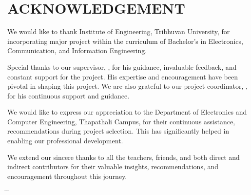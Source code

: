 \chapter*{ACKNOWLEDGEMENT}
{}

\noindent We would like to thank Institute of Engineering, Tribhuvan University, for incorporating major project within the curriculum of Bachelor's in Electronics, Communication, and Information Engineering.

\noindent Special thanks to our supervisor, \textbf{\cSupervisor}, for his guidance, invaluable feedback, and constant support for the project. His expertise and encouragement have been pivotal in shaping this project. We are also grateful to our project coordinator, \textbf{\cProjectCoordinator}, for his continuous support and guidance.

\noindent We would like to express our appreciation to the Department of Electronics and Computer Engineering, Thapathali Campus, for their continuous assistance, recommendations during project selection. This has significantly helped in enabling our professional development.

\noindent We extend our sincere thanks to all the teachers, friends, and both direct and indirect contributors for their valuable insights, recommendations, and encouragement throughout this journey.

\begin{tabbing}
    \hspace{4cm} \= \hspace{5cm} \= \kill
    {{\cSubmittedI}} \> {\cSubmittedIRoll} \\
    {{\cSubmittedII}} \> {\cSubmittedIIRoll} \\
    {{\cSubmittedIII}} \> {\cSubmittedIIIRoll}
\end{tabbing}
